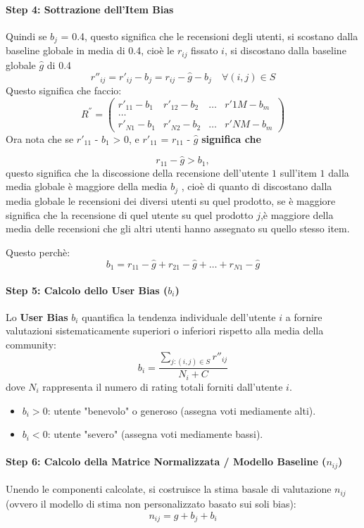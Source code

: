 \paragraph{Step 4: Sottrazione dell'Item Bias}
Quindi se $b_j$ = 0.4, questo significa che le recensioni degli utenti, si scostano dalla baseline globale in media di 0.4, cioè le $r_{ij}$ fissato $i$, si discostano dalla baseline globale $\hat{g}$ di 0.4
\[
r''_{ij} = r'_{ij} - b_j = r_{ij} - \hat{g} - b_j \quad \forall (i,j) \in S
\]
Questo significa che faccio:
\[
    R^{''} = \begin{pmatrix}
        r'_{11} - b_1 & r'_{12} - b_2 & \dots & r'{1M} - b_m  \\
        \dots \\
        r'_{N1} - b_1 & r'_{N2} - b_2 & \dots & r'{NM} - b_m
        \end{pmatrix}
\]
Ora nota che se  $r'_{11}$ - $b_1$ > 0, e  $r'_{11}$ = $r_{11}$ - $\hat{g}$ \textbf{significa che} 

\[
r_{11} - \hat{g} > b_1,
\]
questo significa che la discossione della recensione dell'utente $1$ sull'item $1$ dalla media globale è maggiore della media $b_j$ , cioè di quanto di discostano dalla media globale le recensioni dei diversi utenti su quel prodotto,
se è maggiore significa che la recensione di quel utente su quel prodotto $j$,è maggiore della media delle recensioni che gli altri utenti hanno assegnato su quello stesso item. 

Questo perchè:
\[
    b_1 = r_{11}-\hat{g} + r_{21}-\hat{g} + \dots + r_{N1} - \hat{g}
\]


\paragraph{Step 5: Calcolo dello User Bias ($b_i$)}
Lo \textbf{User Bias} $b_i$ quantifica la tendenza individuale dell'utente $i$ a fornire valutazioni sistematicamente superiori o inferiori rispetto alla media della community:
\[
b_i = \frac{\sum_{j: (i,j) \in S} r''_{ij}}{N_i + C}
\]
dove $N_i$ rappresenta il numero di rating totali forniti dall'utente $i$.
\begin{itemize}
    \item $b_i > 0$: utente "benevolo" o generoso (assegna voti mediamente alti).
    \item $b_i < 0$: utente "severo" (assegna voti mediamente bassi).
\end{itemize}

\paragraph{Step 6: Calcolo della Matrice Normalizzata / Modello Baseline ($n_{ij}$)}
Unendo le componenti calcolate, si costruisce la stima basale di valutazione $n_{ij}$ (ovvero il modello di stima non personalizzato basato sui soli bias):
\begin{equation}
n_{ij} = \hat{g} + b_j + b_i
\end{equation}

